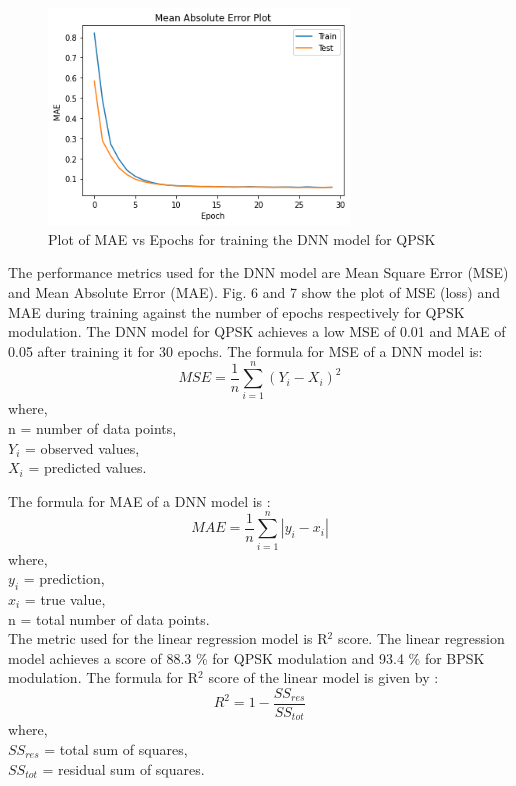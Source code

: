 \documentclass[conference]{IEEEtran}
\begin{document}
\begin{figure}[htbp]
\centerline{\includegraphics[width=8cm]{mae_qpsk_v2.png}}
\caption{Plot of MAE vs Epochs for training the DNN model for QPSK}
\label{mae_qpsk}
\end{figure}

The performance metrics used for the DNN model are Mean Square Error (MSE) and Mean Absolute Error (MAE). Fig. 6 and 7 show the plot of MSE (loss) and MAE during training against the number of epochs respectively for QPSK modulation. The DNN model for QPSK achieves a low MSE of 0.01 and MAE of 0.05 after training it for 30 epochs. The formula for MSE of a DNN model is:
\begin{equation}
     MSE = \displaystyle\frac{1}{n}\sum_{i=1}^{n}(Y_i - X_i)^2
\label{mse}
\end{equation}
where,\\
{n} =   number of data points,\\
${Y_i}$ =   observed values,\\
${X_i}$ =   predicted values.

The formula for MAE of a DNN model is : 
\begin{equation}
    MAE = \frac{1}{n}\sum_{i=1}^{n}|y_i - x_i|
\end{equation}
where, \\
${y_i}$ =   prediction, \\
${x_i}$ =   true value, \\
{n} =   total number of data points.\\

The metric used for the linear regression model is R$^{2}$ score. The linear regression model achieves a score of 88.3 \% for QPSK modulation and 93.4 \% for BPSK modulation. The formula for R$^{2}$ score of the linear model is given by : 
\begin{equation}
    R^{2} = {1 - \frac{SS_{res}}{SS_{tot}}}
\end{equation}
where,\\
${SS_{res}}$ = total sum of squares,\\
${SS_{tot}}$ = residual sum of squares.\\
\end{document}
